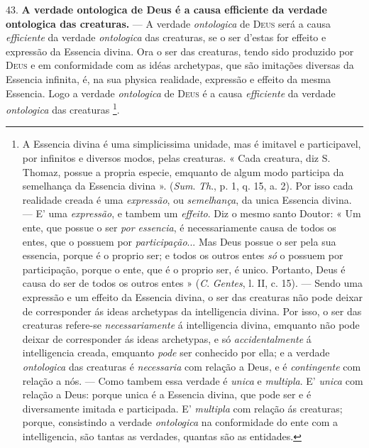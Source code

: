  43. \textbf{A verdade ontologica de Deus é a causa efficiente da verdade ontologica das creaturas.} --- A verdade \emph{ontologica} de \textsc{Deus} será a causa \emph{efficiente} da verdade \emph{ontologica} das creaturas, se o ser d'estas for effeito e expressão da Essencia divina. Ora o ser das creaturas, tendo sido produzido por \textsc{Deus} e em conformidade com as idéas archetypas, que são imitações diversas da Essencia infinita, é, na sua physica realidade, expressão e effeito da mesma Essencia. Logo a verdade \emph{ontologica} de \textsc{Deus} é a causa \emph{efficiente} da verdade \emph{ontologica} das creaturas \footnote{A Essencia divina é uma simplicissima unidade, mas é imitavel e participavel, por infinitos e diversos modos, pelas creaturas. « Cada creatura, diz S. Thomaz, possue a propria especie, emquanto de algum modo participa da semelhança da Essencia divina ». (\emph{Sum}. \emph{Th}., p. 1, q. 15, a. 2). Por isso cada realidade creada é uma \emph{expressão}, ou \emph{semelhança}, da unica Essencia divina. --- E' uma \emph{expressão}, e tambem um \emph{effeito}. Diz o mesmo santo Doutor: « Um ente, que possue o ser \emph{por essencia}, é necessariamente causa de todos os entes, que o possuem por \emph{participação}... Mas Deus possue o ser pela sua essencia, porque é o proprio ser; e todos os outros entes \emph{só} o possuem por participação, porque o ente, que é o proprio ser, é unico. Portanto, Deus é causa do ser de todos os outros entes » (\emph{C}. \emph{Gentes}, l. II, c. 15). --- Sendo uma expressão e um effeito da Essencia divina, o ser das creaturas não pode deixar de corresponder ás ideas archetypas da intelligencia divina. Por isso, o ser das creaturas refere-se \emph{necessariamente} á intelligencia divina, emquanto não pode deixar de corresponder ás ideas archetypas, e só \emph{accidentalmente} á intelligencia creada, emquanto \emph{pode} ser conhecido por ella; e a verdade \emph{ontologica} das creaturas é \emph{necessaria} com relação a Deus, e é \emph{contingente} com relação a nós. --- Como tambem essa verdade é \emph{unica} e \emph{multipla}. E' \emph{unica} com relação a Deus: porque unica é a Essencia divina, que pode ser e é diversamente imitada e participada. E' \emph{multipla} com relação ás creaturas; porque, consistindo a verdade \emph{ontologica} na conformidade do ente com a intelligencia, são tantas as verdades, quantas são as entidades.}.

